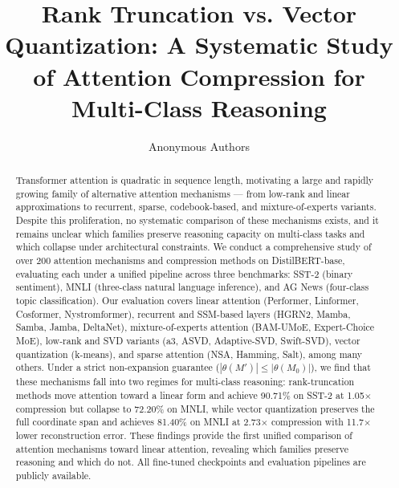\documentclass{article}
\title{Rank Truncation vs. Vector Quantization: A Systematic Study of Attention Compression for Multi-Class Reasoning}
\author{Anonymous Authors}
\begin{document}
\maketitle

\begin{abstract}
Transformer attention is quadratic in sequence length, motivating a large and rapidly growing family of alternative attention mechanisms --- from low-rank and linear approximations to recurrent, sparse, codebook-based, and mixture-of-experts variants. Despite this proliferation, no systematic comparison of these mechanisms exists, and it remains unclear which families preserve reasoning capacity on multi-class tasks and which collapse under architectural constraints. We conduct a comprehensive study of over 200 attention mechanisms and compression methods on DistilBERT-base, evaluating each under a unified pipeline across three benchmarks: SST-2 (binary sentiment), MNLI (three-class natural language inference), and AG News (four-class topic classification). Our evaluation covers linear attention (Performer, Linformer, Cosformer, Nystromformer), recurrent and SSM-based layers (HGRN2, Mamba, Samba, Jamba, DeltaNet), mixture-of-experts attention (BAM-UMoE, Expert-Choice MoE), low-rank and SVD variants (a3, ASVD, Adaptive-SVD, Swift-SVD), vector quantization (k-means), and sparse attention (NSA, Hamming, Salt), among many others. Under a strict non-expansion guarantee ($|\theta(M')| \le |\theta(M_0)|$), we find that these mechanisms fall into two regimes for multi-class reasoning: rank-truncation methods move attention toward a linear form and achieve 90.71\% on SST-2 at 1.05$\times$ compression but collapse to 72.20\% on MNLI, while vector quantization preserves the full coordinate span and achieves 81.40\% on MNLI at 2.73$\times$ compression with 11.7$\times$ lower reconstruction error. These findings provide the first unified comparison of attention mechanisms toward linear attention, revealing which families preserve reasoning and which do not. All fine-tuned checkpoints and evaluation pipelines are publicly available.
\end{abstract}
\end{document}
